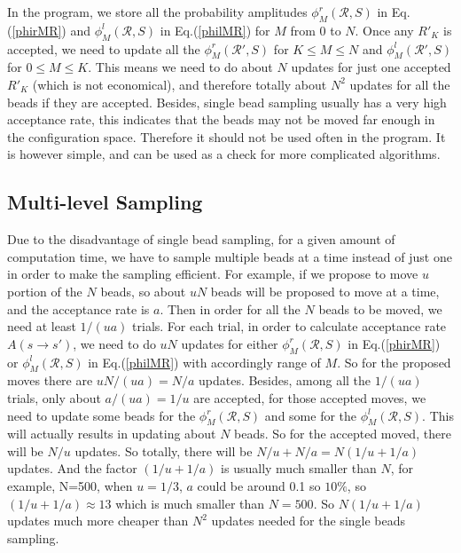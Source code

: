 \documentclass[12pt,letterpaper,UTF8]{report}
\begin{document}
In the program, we store all the probability amplitudes $\phi^r_{M}(\mathcal{R},S)$ in Eq.(\ref{phirMR}) and $\phi^l_{M}(\mathcal{R},S)$ in Eq.(\ref{philMR}) for $M$ from 0 to $N$. Once any $R'_K$ is accepted, we need to update all the $\phi^r_{M}(\mathcal{R}',S)$ for $K \leq M \leq N$ and $\phi^l_{M}(\mathcal{R}',S)$ for $0\leq M \leq K$.
This means we need to do about $N$ updates for just one accepted $R'_K$ (which is not economical), and therefore totally about $N^2$ updates for all the beads if they are accepted.
Besides, single bead sampling usually has a very high acceptance rate, this indicates that the beads may not be moved far enough in the configuration space.
Therefore it should not be used often in the program.
It is however simple, and can be used as a check for more complicated algorithms.

\subsection{Multi-level Sampling}
\label{secMultibeadSample}

Due to the disadvantage of single bead sampling, for a given amount of computation time, we have to sample multiple beads at a time instead of just one in order to make the sampling efficient.
For example, if we propose to move $u$ portion of the $N$ beads, so about $uN$ beads will be proposed to move at a time, and the acceptance rate is $a$. Then in order for all the $N$ beads to be moved, we need at least $1/(ua)$ trials. For each trial, in order to calculate acceptance rate $A(s\rightarrow s')$, we need to do $uN$ updates for either $\phi^r_{M}(\mathcal{R},S)$ in Eq.(\ref{phirMR}) or $\phi^l_{M}(\mathcal{R},S)$ in Eq.(\ref{philMR})  with accordingly range of $M$. So for the proposed moves there are $uN/(ua)=N/a$ updates. Besides, among all the  $1/(ua)$ trials, only about $a/(ua)=1/u$ are accepted, for those accepted moves, we need to update some beads for the $\phi^r_{M}(\mathcal{R},S)$ and some for the $\phi^l_{M}(\mathcal{R},S)$. This will actually results in updating about $N$ beads. So for the accepted moved, there will be $N/u$ updates. So totally, there will be $N/u+N/a=N(1/u+1/a)$ updates. And the factor $(1/u+1/a)$ is usually much smaller than $N$, for example, N=500, when $u=1/3$, $a$ could be around 0.1 so $10\%$, so $(1/u+1/a) \approx 13$ which is much smaller than $N=500$. So $N(1/u+1/a)$ updates much more cheaper than $N^2$ updates needed for the single beads sampling.
\end{document}
